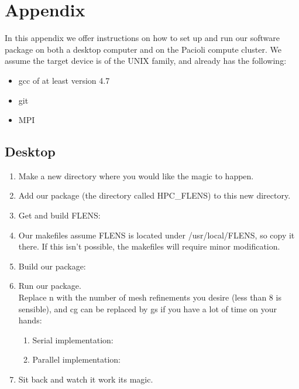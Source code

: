 \newpage
\appendix
{}
\section{Appendix}

In this appendix we offer instructions on how to set up and run our software package on both a desktop computer and on the Pacioli compute cluster. We assume the target device is of the UNIX family, and already has the following:

\begin{itemize}
   \item gcc of at least version 4.7
   \item git
   \item MPI
\end{itemize}

\subsection{Desktop}

\begin{enumerate}
   \item Make a new directory where you would like the magic to happen.
   \item Add our package (the directory called HPC\_FLENS) to this new directory.
   \item Get and build FLENS: 
   
   \item Our makefiles assume FLENS is located under /usr/local/FLENS, so copy it there. If this isn't possible, the makefiles will require minor modification.
   
   \item Build our package:
   
   \item Run our package.\\
   Replace n with the number of mesh refinements you desire (less than 8 is sensible), and cg can be replaced by gs if you have a lot of time on your hands:
   
   \begin{enumerate}
   
      \item Serial implementation:
      \item Parallel implementation:
      
   \end{enumerate}
   
   \item Sit back and watch it work its magic.
\end{enumerate}
      
